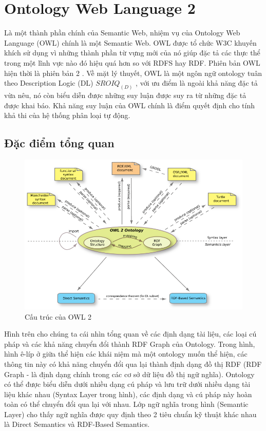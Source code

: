 \section{Ontology Web Language 2}
Là một thành phần chính của Semantic Web, nhiệm vụ của Ontology Web Language (OWL) chính là một Semantic Web. OWL được tổ chức W3C khuyến khích sử dụng vì những thành phần từ vựng mới của nó giúp đặc tả các thực thể trong một lĩnh vực nào đó hiệu quá hơn so với RDFS hay RDF. Phiên bản OWL hiện thời là phiên bản 2 \cite{owl2}. Về mặt lý thuyết, OWL là một ngôn ngữ ontology tuân theo Description Logic (DL) $SROIQ_{(D)}$ \cite{DL}, với ưu điểm là ngoài  khả năng đặc tả vừa nêu, nó còn biểu diễn được những suy luận được suy ra từ những đặc tả được khai báo. Khả năng suy luận của OWL chính là điểm quyết định cho tính khả thi của hệ thống phân loại tự động.
\subsection{Đặc điểm tổng quan}
\begin{figure}[h!]
	\centering
	\includegraphics[width=130mm]{Figures/owl2structure.png}
	\caption{Cấu trúc của OWL 2\label{overflow}}
\end{figure}
Hình trên cho chúng ta cái nhìn tổng quan về các định dạng tài liệu, các loại cú pháp và các khả năng chuyển đổi thành RDF Graph của Ontology. Trong hình, hình ê-líp ở giữa thể hiện các khái niệm mà một ontology muốn thể hiện, các thông tin này có khả năng chuyển đổi qua lại thành định dạng đồ thị RDF \cite{mapping_rdf_graph} (RDF Graph - là định dạng chính trong các cơ sở dữ liệu đồ thị ngữ nghĩa). Ontology có thể được biểu diễn dưới nhiều dạng cú pháp và lưu trữ dưới nhiều dạng tài liệu khác nhau (Syntax Layer trong hình), các định dạng và cú pháp này hoàn toàn có thể chuyển đổi qua lại với nhau. Lớp ngữ nghĩa trong hình (Semantic Layer) cho thấy ngữ nghĩa được quy định theo 2 tiêu chuẩn kỹ thuật khác nhau là Direct Semantics và RDF-Based Semantics.
